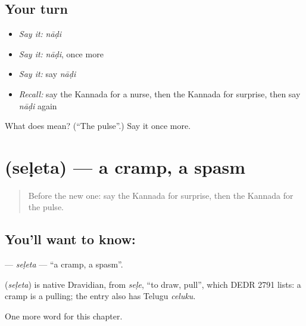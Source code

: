 \subsection*{Your turn}
\begin{itemize}
\raggedright
  \item \emph{Say it:} \emph{nāḍi}
  \item \emph{Say it:} \emph{nāḍi}, once more
  \item \emph{Say it:} say \emph{nāḍi}
  \item \emph{Recall:} say the Kannada for a nurse, then the Kannada for surprise, then say \emph{nāḍi} again
\end{itemize}

\begin{tcolorbox}[breakable,colback=teal!4,colframe=teal!35!black,title={Before you move on}]
What does  mean? (\textquotedblleft{}The pulse\textquotedblright{}.) Say it once more.
\end{tcolorbox}
\section[\texorpdfstring{\kn{ಸೆಳೆತ} (seḷeta)}{ಸೆಳೆತ (seḷeta)}]{ (seḷeta) — a cramp, a spasm}

\label{lesson:KA-C283-seleta}



\begin{quote}
Before the new one: say the Kannada for surprise, then the Kannada for the pulse.
\end{quote}

\subsection*{You'll want to know: }
\textbf{} — \emph{seḷeta} — \textquotedblleft{}a cramp, a spasm\textquotedblright{}.

\begin{cousinweb}
\textbf{} (\emph{seḷeta}) is native Dravidian, from \emph{seḷe}, \textquotedblleft{}to draw, pull\textquotedblright{}, which DEDR 2791 lists: a cramp is a pulling; the entry also has Telugu \emph{celuku}.
\end{cousinweb}

\begin{grammarlens}[title={What you've built}]
One more word for this chapter.
\end{grammarlens}

